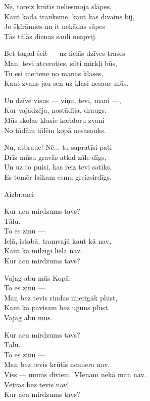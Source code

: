 \documentclass[14pt]{extarticle}
\begin{document}
{{Nē, toreiz krūtīs neliesmoja slāpes,\\
Kaut kāda trauksme, kaut kas dīvains bij,\\
Jo šķīrāmies un it nekādas sāpes\\
Tās tālās dienas sauli neapvij. 

Bet tagad šeit --- uz lielās dzīves trases ---\\
Man, tevi atceroties, silti mirkļi būs,\\
Tu esi meitene no manas klases,\\
Kaut zvans jau sen uz klasi nesauc mūs. 

Un dzīve visus --- viņu, tevi, mani ---,\\
Kur vajadzēja, nostādīja, draugs.\\
Mūs skolas klusie koridoru zvani\\
No tādām tālēm kopā nesasauks.

Nu, atbrauc! Nē... tu sapratīsi pati ---\\
Drīz mūsu gravās atkal zāle dīgs,\\
Un uz to puisi, kas reiz tevi satiks,\\
Es tomēr laikam esmu greizsirdīgs. 


\newpage

{\large \sc Aizbrauci}

Kur acu mirdzums tavs?\\
\mbox{}\hspace{20pt}Tālu.\\
\mbox{}\hspace{10pt}To es zinu ---\\
Ielā, istabā, tramvajā kaut kā nav,\\
Kaut kā milzīgi liela nav.\\
Kur acu mirdzums tavs?

Vajag abu mūs
\mbox{}\hspace{20pt}Kopā.\\
\mbox{}\hspace{10pt}To es zinu ---\\
Man bez tevis rindas mierīgāk plūst,\\
Kaut kā pavisam bez uguns plūst.\\
Vajag abu mūs. 

Kur acu mirdzums tavs?\\
\mbox{}\hspace{20pt}Tālu.\\
\mbox{}\hspace{10pt}To es zinu ---\\
Man bez tevis krūtīs nemiera nav.\\
Viss --- mums diviem. VIenam nekā man nav.\\
\mbox{}\hspace{10pt}Vētras bez tevis nav!\\
Kur acu mirdzums tavs?

}}
\end{document}
